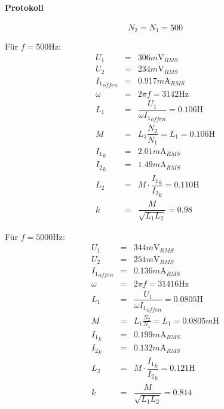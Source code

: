 \documentclass[10pt]{scrreprt}
\begin{document}
        \paragraph{Protokoll}



        \begin{equation*}
            N_2 = N_1 = 500
        \end{equation*}

        Für $f=500\si{\hertz}$:
        \begin{eqnarray*}
            U_1 &=& 306\si{m\volt}_{RMS}\\
            U_2 &=& 234\si{m\volt}_{RMS}\\
            {I_1}_{offen} &=& 0.917 \si{m\ampere}_{RMS}\\
            \omega &=& 2 \pi f = 3142 \si{\hertz}\\
            L_1 &=& \dfrac{U_1}{\omega {I_1}_{offen}} = 0.106 \si{\henry}\\
            M &=& L_1 \dfrac{N_2}{N_1} = L_1 = 0.106 \si{\henry}\\
            {I_1}_{k} &=& 2.01\si{m\ampere}_{RMS}\\
            {I_2}_{k} &=& 1.49\si{m\ampere}_{RMS}\\
            L_2 &=& M \cdot \dfrac{{I_1}_{k}}{{I_2}_{k}} =
            0.110 \si{\henry}\\
            k &=& \dfrac{M}{\sqrt{L_1 L_2}} = 0.98
        \end{eqnarray*}

        Für $f=5000\si{\hertz}$:
        \begin{eqnarray*}
            U_1 &=& 344\si{m\volt}_{RMS}\\
            U_2 &=& 251\si{m\volt}_{RMS}\\
            {I_1}_{offen} &=& 0.136 \si{m\ampere}_{RMS}\\
            \omega &=& 2 \pi f = 31416 \si{\hertz}\\
            L_1 &=& \dfrac{U_1}{\omega {I_1}_{offen}} =  0.0805\si{\henry}\\
            M &=& L_1 \frac{N_2}{N_1} = L_1 =  0.0805\si{m\henry}\\
            {I_1}_{k} &=& 0.199\si{m\ampere}_{RMS}\\
            {I_2}_{k} &=& 0.132\si{m\ampere}_{RMS}\\
            L_2 &=& M \cdot \dfrac{{I_1}_{k}}{{I_2}_{k}} =0.121
             \si{\henry}\\
            k &=& \dfrac{M}{\sqrt{L_1 L_2}} = 0.814
        \end{eqnarray*}
\end{document}
